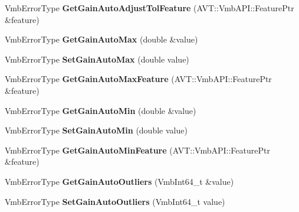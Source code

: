 \begin{DoxyCompactItemize}
\item 
\hypertarget{classMakoCamera_a0202ae5ffaed6b9635cf894d19688a17}{Vmb\-Error\-Type {\bfseries Get\-Gain\-Auto\-Adjust\-Tol\-Feature} (A\-V\-T\-::\-Vmb\-A\-P\-I\-::\-Feature\-Ptr \&feature)}\label{classMakoCamera_a0202ae5ffaed6b9635cf894d19688a17}

\item 
\hypertarget{classMakoCamera_a7076deeeb52cd7806e101e295fc38a97}{Vmb\-Error\-Type {\bfseries Get\-Gain\-Auto\-Max} (double \&value)}\label{classMakoCamera_a7076deeeb52cd7806e101e295fc38a97}

\item 
\hypertarget{classMakoCamera_aa01232d49f56a19f4314a1325021ce88}{Vmb\-Error\-Type {\bfseries Set\-Gain\-Auto\-Max} (double value)}\label{classMakoCamera_aa01232d49f56a19f4314a1325021ce88}

\item 
\hypertarget{classMakoCamera_ae2a96dfceb966682c8f725baefd0d22d}{Vmb\-Error\-Type {\bfseries Get\-Gain\-Auto\-Max\-Feature} (A\-V\-T\-::\-Vmb\-A\-P\-I\-::\-Feature\-Ptr \&feature)}\label{classMakoCamera_ae2a96dfceb966682c8f725baefd0d22d}

\item 
\hypertarget{classMakoCamera_a8f8ca7a55492ddfa597541d375f91615}{Vmb\-Error\-Type {\bfseries Get\-Gain\-Auto\-Min} (double \&value)}\label{classMakoCamera_a8f8ca7a55492ddfa597541d375f91615}

\item 
\hypertarget{classMakoCamera_a3866f6288f86fa62d6f35fec26ad35cb}{Vmb\-Error\-Type {\bfseries Set\-Gain\-Auto\-Min} (double value)}\label{classMakoCamera_a3866f6288f86fa62d6f35fec26ad35cb}

\item 
\hypertarget{classMakoCamera_af159f8f9a63a4b750c900126bf43a350}{Vmb\-Error\-Type {\bfseries Get\-Gain\-Auto\-Min\-Feature} (A\-V\-T\-::\-Vmb\-A\-P\-I\-::\-Feature\-Ptr \&feature)}\label{classMakoCamera_af159f8f9a63a4b750c900126bf43a350}

\item 
\hypertarget{classMakoCamera_ab28104564d69ac6891e5a960082f69ad}{Vmb\-Error\-Type {\bfseries Get\-Gain\-Auto\-Outliers} (Vmb\-Int64\-\_\-t \&value)}\label{classMakoCamera_ab28104564d69ac6891e5a960082f69ad}

\item 
\hypertarget{classMakoCamera_a7467b5cb2a3dd884f1ac171b52b9e752}{Vmb\-Error\-Type {\bfseries Set\-Gain\-Auto\-Outliers} (Vmb\-Int64\-\_\-t value)}\label{classMakoCamera_a7467b5cb2a3dd884f1ac171b52b9e752}


\end{DoxyCompactItemize}
